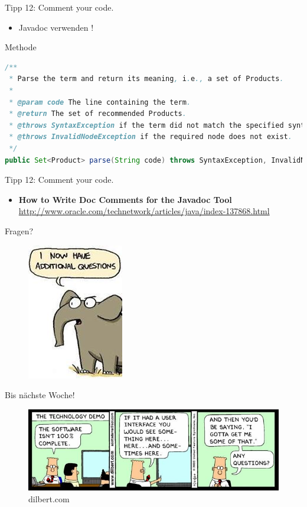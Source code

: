 \documentclass[18pt]{beamer}
\begin{document}
\begin{frame}[fragile]{Tipp 12: Comment your code.}
    \begin{itemize}
        \item Javadoc verwenden !
    \end{itemize}
    \begin{exampleblock}{Methode}
        \begin{lstlisting}[language=Java,basicstyle=\tiny]
/**
 * Parse the term and return its meaning, i.e., a set of Products.
 *
 * @param code The line containing the term.
 * @return The set of recommended Products.
 * @throws SyntaxException if the term did not match the specified syntax rules.
 * @throws InvalidNodeException if the required node does not exist.
 */
public Set<Product> parse(String code) throws SyntaxException, InvalidNodeException { ... }
        \end{lstlisting}
    \end{exampleblock}
\end{frame}

\begin{frame}{Tipp 12: Comment your code.}
    \begin{itemize}
        \item \textbf{How to Write Doc Comments for the Javadoc Tool}\\
        \url{http://www.oracle.com/technetwork/articles/java/index-137868.html}
    \end{itemize}
\end{frame}

\begin{frame}{Fragen?}
    \begin{figure}
        \includegraphics[scale=.6]{img/additionalquestions.jpg}
    \end{figure}
\end{frame}

\begin{frame}{Bis nächste Woche!}
    \begin{figure}
        \includegraphics[scale=.6]{img/dilbert-software-demo.jpg}
        \caption{\footnotesize{dilbert.com}}
    \end{figure}
\end{frame}

\backupend
\end{document}

